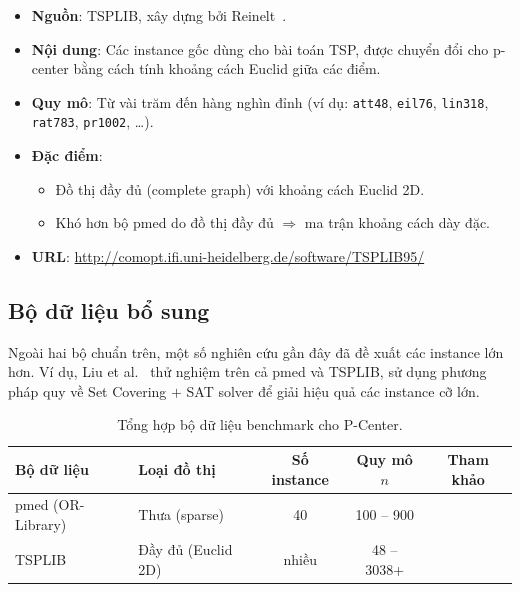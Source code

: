 \documentclass[11pt,a4paper]{article}
\begin{document}
\begin{itemize}[nosep]
    \item \textbf{Nguồn}: TSPLIB, xây dựng bởi Reinelt~\cite{reinelt1991tsplib}.
    \item \textbf{Nội dung}: Các instance gốc dùng cho bài toán TSP, được chuyển đổi cho p-center bằng cách tính khoảng cách Euclid giữa các điểm.
    \item \textbf{Quy mô}: Từ vài trăm đến hàng nghìn đỉnh (ví dụ: \texttt{att48}, \texttt{eil76}, \texttt{lin318}, \texttt{rat783}, \texttt{pr1002}, \ldots).
    \item \textbf{Đặc điểm}:
    \begin{itemize}[nosep]
        \item Đồ thị đầy đủ (complete graph) với khoảng cách Euclid 2D.
        \item Khó hơn bộ pmed do đồ thị đầy đủ $\Rightarrow$ ma trận khoảng cách dày đặc.
    \end{itemize}
    \item \textbf{URL}: \url{http://comopt.ifi.uni-heidelberg.de/software/TSPLIB95/}
\end{itemize}

\subsection{Bộ dữ liệu bổ sung}

Ngoài hai bộ chuẩn trên, một số nghiên cứu gần đây đã đề xuất các instance lớn hơn.
Ví dụ, Liu et al.~\cite{liu2020effective} thử nghiệm trên cả pmed và TSPLIB, sử dụng phương pháp quy về Set Covering $+$ SAT solver để giải hiệu quả các instance cỡ lớn.

\begin{table}[h]
\centering
\caption{Tổng hợp bộ dữ liệu benchmark cho P-Center.}
\label{tab:datasets}
\begin{tabular}{llccc}
\toprule
\textbf{Bộ dữ liệu} & \textbf{Loại đồ thị} & \textbf{Số instance} & \textbf{Quy mô $n$} & \textbf{Tham khảo} \\
\midrule
pmed (OR-Library) & Thưa (sparse) & 40 & 100 -- 900 & \cite{beasley1990or} \\
TSPLIB & Đầy đủ (Euclid 2D) & nhiều & 48 -- 3038+ & \cite{reinelt1991tsplib} \\
\bottomrule
\end{tabular}
\end{table}
\end{document}
